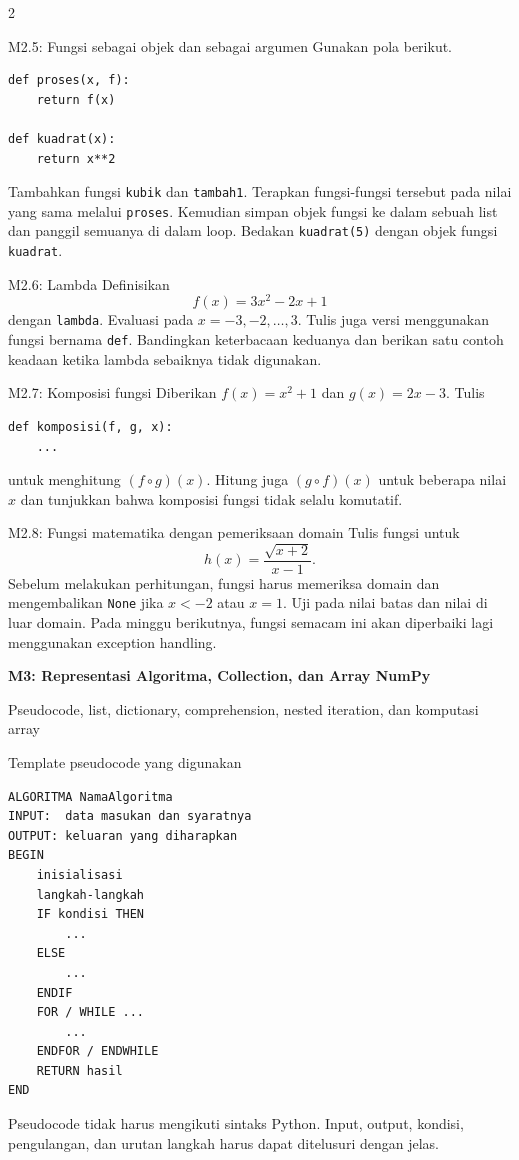 \documentclass[9pt,a4paper]{article}
\newcommand{\bab}[2]{%
  \vspace{2pt}
  {\color{iteraBlue}\Large\bfseries #1}\par
  {\color{darkgray}\small #2}\par\vspace{3pt}
}
\begin{document}
\begin{multicols}{2}
\begin{qbox}[L3]{M2.5: Fungsi sebagai objek dan sebagai argumen}
Gunakan pola berikut.
\begin{lstlisting}
def proses(x, f):
    return f(x)

def kuadrat(x):
    return x**2
\end{lstlisting}
Tambahkan fungsi \texttt{kubik} dan \texttt{tambah1}. Terapkan fungsi-fungsi tersebut pada nilai yang sama melalui \texttt{proses}. Kemudian simpan objek fungsi ke dalam sebuah list dan panggil semuanya di dalam loop. Bedakan \texttt{kuadrat(5)} dengan objek fungsi \texttt{kuadrat}.
\end{qbox}

\begin{qbox}[L3]{M2.6: Lambda}
Definisikan
\[
f(x)=3x^2-2x+1
\]
dengan \texttt{lambda}. Evaluasi pada $x=-3,-2,\ldots,3$. Tulis juga versi menggunakan fungsi bernama \texttt{def}. Bandingkan keterbacaan keduanya dan berikan satu contoh keadaan ketika lambda sebaiknya tidak digunakan.
\end{qbox}

\begin{qbox}[L3]{M2.7: Komposisi fungsi}
Diberikan $f(x)=x^2+1$ dan $g(x)=2x-3$. Tulis
\begin{lstlisting}
def komposisi(f, g, x):
    ...
\end{lstlisting}
untuk menghitung $(f\circ g)(x)$. Hitung juga $(g\circ f)(x)$ untuk beberapa nilai $x$ dan tunjukkan bahwa komposisi fungsi tidak selalu komutatif.
\end{qbox}

\begin{qbox}[L4]{M2.8: Fungsi matematika dengan pemeriksaan domain}
Tulis fungsi untuk
\[
h(x)=\frac{\sqrt{x+2}}{x-1}.
\]
Sebelum melakukan perhitungan, fungsi harus memeriksa domain dan mengembalikan \texttt{None} jika $x<-2$ atau $x=1$. Uji pada nilai batas dan nilai di luar domain. Pada minggu berikutnya, fungsi semacam ini akan diperbaiki lagi menggunakan exception handling.
\end{qbox}

\bab{M3: Representasi Algoritma, Collection, dan Array NumPy}{Pseudocode, list, dictionary, comprehension, nested iteration, dan komputasi array}

\begin{conceptbox}{Template pseudocode yang digunakan}
\begin{lstlisting}[language={}]
ALGORITMA NamaAlgoritma
INPUT:  data masukan dan syaratnya
OUTPUT: keluaran yang diharapkan
BEGIN
    inisialisasi
    langkah-langkah
    IF kondisi THEN
        ...
    ELSE
        ...
    ENDIF
    FOR / WHILE ...
        ...
    ENDFOR / ENDWHILE
    RETURN hasil
END
\end{lstlisting}
Pseudocode tidak harus mengikuti sintaks Python. Input, output, kondisi, pengulangan, dan urutan langkah harus dapat ditelusuri dengan jelas.
\end{conceptbox}


\end{multicols}
\end{document}
